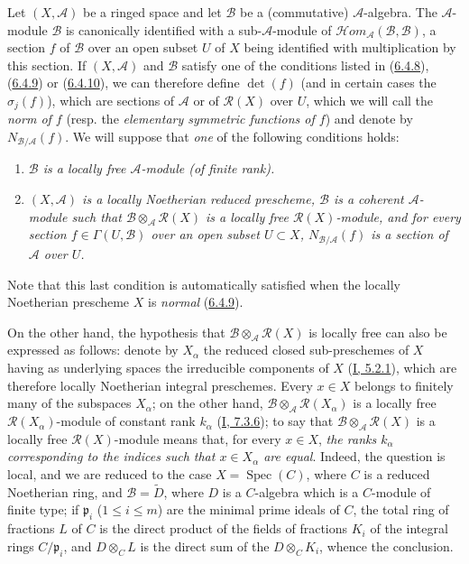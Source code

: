 \begin{env}[6.5.1]
\label{II.6.5.1}
Let $(X,\mathcal{A})$ be a ringed space and let $\mathcal{B}$ be a
(commutative) $\mathcal{A}$-algebra. The $\mathcal{A}$-module $\mathcal{B}$
is canonically identified with a sub-$\mathcal{A}$-module of
$\mathcal{H}om_{\mathcal{A}}(\mathcal{B},\mathcal{B})$, a section $f$ of
$\mathcal{B}$ over an open subset $U$ of $X$ being identified with
multiplication by this section. If $(X,\mathcal{A})$ and $\mathcal{B}$
satisfy one of the conditions listed in
(\hyperref[II.6.4.8]{6.4.8}), (\hyperref[II.6.4.9]{6.4.9}) or
(\hyperref[II.6.4.10]{6.4.10}), we can therefore define $\det(f)$ (and in
certain cases the $\sigma_j(f)$), which are sections of $\mathcal{A}$ or of
$\mathcal{R}(X)$ over $U$, which we will call the \emph{norm of $f$} (resp.
the \emph{elementary symmetric functions of $f$}) and denote by
$N_{\mathcal{B}/\mathcal{A}}(f)$. We will suppose that \emph{one} of the
following conditions holds:
\begin{enumerate}
\item[(I)] \emph{$\mathcal{B}$ is a locally free $\mathcal{A}$-module
(of finite rank).}
\item[(II)] \emph{$(X,\mathcal{A})$ is a locally Noetherian reduced
prescheme, $\mathcal{B}$ is a coherent $\mathcal{A}$-module such that
$\mathcal{B}\otimes_{\mathcal{A}}\mathcal{R}(X)$ is a locally free
$\mathcal{R}(X)$-module, and for every section
$f\in\Gamma(U,\mathcal{B})$ over an open subset $U\subset X$,
$N_{\mathcal{B}/\mathcal{A}}(f)$ is a section of $\mathcal{A}$ over $U$.}
\end{enumerate}


Note that this last condition is automatically satisfied when the locally
Noetherian prescheme $X$ is \emph{normal}
(\hyperref[II.6.4.9]{6.4.9}).

On the other hand, the hypothesis that
$\mathcal{B}\otimes_{\mathcal{A}}\mathcal{R}(X)$ is locally free can also be
expressed as follows: denote by $X_\alpha$ the reduced closed sub-preschemes
of $X$ having as underlying spaces the irreducible components of $X$
(\hyperref[I.5.2.1]{I, 5.2.1}), which are therefore locally Noetherian
integral preschemes. Every $x\in X$ belongs to finitely many of the
subspaces $X_\alpha$; on the other hand,
$\mathcal{B}\otimes_{\mathcal{A}}\mathcal{R}(X_\alpha)$ is a locally free
$\mathcal{R}(X_\alpha)$-module of constant rank $k_\alpha$
(\hyperref[I.7.3.6]{I, 7.3.6}); to say that
$\mathcal{B}\otimes_{\mathcal{A}}\mathcal{R}(X)$ is a locally free
$\mathcal{R}(X)$-module means that, for every $x\in X$, \emph{the ranks
$k_\alpha$ corresponding to the indices such that $x\in X_\alpha$ are
equal}. Indeed, the question is local, and we are reduced to the case
$X=\operatorname{Spec}(C)$, where $C$ is a reduced Noetherian ring, and
$\mathcal{B}=\widetilde{D}$, where $D$ is a $C$-algebra which is a
$C$-module of finite type; if $\mathfrak{p}_i$ ($1\leq i\leq m$) are the
minimal prime ideals of $C$, the total ring of fractions $L$ of $C$ is the
direct product of the fields of fractions $K_i$ of the integral rings
$C/\mathfrak{p}_i$, and $D\otimes_C L$ is the direct sum of the
$D\otimes_C K_i$, whence the conclusion.


\end{env}
